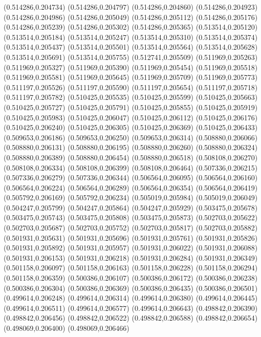 (0.514286,0.204734)
(0.514286,0.204797)
(0.514286,0.204860)
(0.514286,0.204923)
(0.514286,0.204986)
(0.514286,0.205049)
(0.514286,0.205112)
(0.514286,0.205176)
(0.514286,0.205239)
(0.514286,0.205302)
(0.514286,0.205365)
(0.513514,0.205120)
(0.513514,0.205184)
(0.513514,0.205247)
(0.513514,0.205310)
(0.513514,0.205374)
(0.513514,0.205437)
(0.513514,0.205501)
(0.513514,0.205564)
(0.513514,0.205628)
(0.513514,0.205691)
(0.513514,0.205755)
(0.512741,0.205509)
(0.511969,0.205263)
(0.511969,0.205327)
(0.511969,0.205390)
(0.511969,0.205454)
(0.511969,0.205518)
(0.511969,0.205581)
(0.511969,0.205645)
(0.511969,0.205709)
(0.511969,0.205773)
(0.511197,0.205526)
(0.511197,0.205590)
(0.511197,0.205654)
(0.511197,0.205718)
(0.511197,0.205782)
(0.510425,0.205535)
(0.510425,0.205599)
(0.510425,0.205663)
(0.510425,0.205727)
(0.510425,0.205791)
(0.510425,0.205855)
(0.510425,0.205919)
(0.510425,0.205983)
(0.510425,0.206047)
(0.510425,0.206112)
(0.510425,0.206176)
(0.510425,0.206240)
(0.510425,0.206305)
(0.510425,0.206369)
(0.510425,0.206433)
(0.509653,0.206186)
(0.509653,0.206250)
(0.509653,0.206314)
(0.508880,0.206066)
(0.508880,0.206131)
(0.508880,0.206195)
(0.508880,0.206260)
(0.508880,0.206324)
(0.508880,0.206389)
(0.508880,0.206454)
(0.508880,0.206518)
(0.508108,0.206270)
(0.508108,0.206334)
(0.508108,0.206399)
(0.508108,0.206464)
(0.507336,0.206215)
(0.507336,0.206279)
(0.507336,0.206344)
(0.506564,0.206095)
(0.506564,0.206160)
(0.506564,0.206224)
(0.506564,0.206289)
(0.506564,0.206354)
(0.506564,0.206419)
(0.505792,0.206169)
(0.505792,0.206234)
(0.505019,0.205984)
(0.505019,0.206049)
(0.504247,0.205799)
(0.504247,0.205864)
(0.504247,0.205929)
(0.503475,0.205678)
(0.503475,0.205743)
(0.503475,0.205808)
(0.503475,0.205873)
(0.502703,0.205622)
(0.502703,0.205687)
(0.502703,0.205752)
(0.502703,0.205817)
(0.502703,0.205882)
(0.501931,0.205631)
(0.501931,0.205696)
(0.501931,0.205761)
(0.501931,0.205826)
(0.501931,0.205892)
(0.501931,0.205957)
(0.501931,0.206022)
(0.501931,0.206088)
(0.501931,0.206153)
(0.501931,0.206218)
(0.501931,0.206284)
(0.501931,0.206349)
(0.501158,0.206097)
(0.501158,0.206163)
(0.501158,0.206228)
(0.501158,0.206294)
(0.501158,0.206359)
(0.500386,0.206107)
(0.500386,0.206172)
(0.500386,0.206238)
(0.500386,0.206304)
(0.500386,0.206369)
(0.500386,0.206435)
(0.500386,0.206501)
(0.499614,0.206248)
(0.499614,0.206314)
(0.499614,0.206380)
(0.499614,0.206445)
(0.499614,0.206511)
(0.499614,0.206577)
(0.499614,0.206643)
(0.498842,0.206390)
(0.498842,0.206456)
(0.498842,0.206522)
(0.498842,0.206588)
(0.498842,0.206654)
(0.498069,0.206400)
(0.498069,0.206466)
